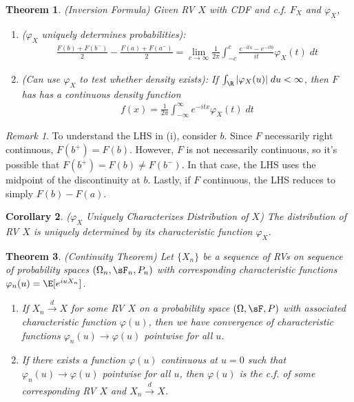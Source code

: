 \documentclass[12pt]{article}
\theoremstyle{plain}
\newtheorem{thm}{Theorem}[section]
\newtheorem{cor}[thm]{Corollary}
\theoremstyle{definition}
\theoremstyle{remark}
\newtheorem*{rmk}{Remark}
\newcommand{\ra}{\rightarrow}
\newcommand{\dto}{\xrightarrow{d}}
\begin{document}
\begin{thm}\emph{(Inversion Formula)}
Given RV $X$ with CDF and c.f. $F_X$ and $\varphi_X$,
\begin{enumerate}[label=\emph{(\roman*)}]
  \item
    (\emph{$\varphi_X$ \emph{uniquely} determines probabilities}):
    \begin{align*}
      \frac{F(b) + F(b^-)}{2}
      - \frac{F(a) + F(a^-)}{2}
      = \lim_{c\ra\infty}
      \frac{1}{2\pi}
      \int^c_{-c}
      \frac{e^{-ita}-e^{-itb}}{it}
      \varphi_X(t) \; dt
    \end{align*}
  \item
    \emph{(Can use $\varphi_X$ to test whether density exists)}:
    If $\int_\R |\varphi_X(u)|\;du<\infty$, then $F$ has has a
    continuous density function
    \begin{align*}
      f(x) = \frac{1}{2\pi}\int_{-\infty}^\infty
      e^{-itx}\varphi_X(t)\;dt
    \end{align*}
\end{enumerate}
\end{thm}
\begin{rmk}
To understand the LHS in (i), consider $b$.
Since $F$ necessarily right continuous, $F(b^+)=F(b)$. However,
$F$ is not necessarily continuous, so it's possible that
$F(b^+)=F(b)\neq F(b^-)$. In that case, the LHS uses the midpoint of
the discontinuity at $b$. Lastly, if $F$ continuous, the LHS
reduces to simply $F(b)-F(a)$.
\end{rmk}

\begin{cor}
\label{cor:charfcnunq}
\emph{($\varphi_X$ Uniquely Characterizes Distribution of $X$)}
The distribution of RV $X$ is uniquely determined by its characteristic
function $\varphi_X$.
\end{cor}

\begin{thm}\emph{(Continuity Theorem)}
Let $\{X_n\}$ be a sequence of RVs on sequence of probability spaces
$(\Omega_n,\sF_n,P_n)$ with corresponding characteristic functions
$\varphi_n(u) = \E[e^{iuX_n}]$.
\begin{enumerate}[label=\emph{(\roman*)}]
  \item If $X_n\dto X$ for some RV $X$ on a probability space
    $(\Omega,\sF,P)$ with associated characteristic function
    $\varphi(u)$, then we have convergence of characteristic
    functions $\varphi_n(u)\ra \varphi(u)$ pointwise
    for all $u$.
  \item
    If there exists a function $\varphi(u)$ continuous at $u=0$ such
    that $\varphi_n(u)\ra\varphi(u)$ pointwise for all $u$,
    then $\varphi(u)$ is the c.f. of some
    corresponding RV $X$ and $X_n\dto X$.
\end{enumerate}
\end{thm}
\end{document}
